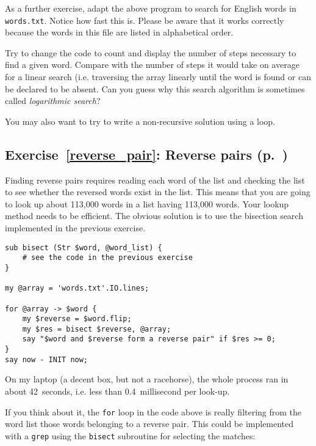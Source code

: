 As a further exercise, adapt the above program to 
search for English words in {\tt words.txt}. Notice 
how fast this is. Please 
be aware that it works correctly because the words 
in this file are listed in alphabetical order.

Try to change 
the code to count and display the number of steps 
necessary to find a given word. Compare with the number 
of steps it would take on average for a linear search 
(i.e. traversing the array linearly until the word 
is found or can be declared to be absent. Can you 
guess why this search algorithm is sometimes 
called \emph{logarithmic search}?

You may also want to try to write a non-recursive solution 
using a loop.


\subsection{Exercise~\ref{reverse_pair}: Reverse pairs (p.~\pageref{reverse_pair})}
\label{sol_reverse_pair}

Finding reverse pairs requires reading each word of 
the list and checking the list to see whether the reversed 
words exist in the list. This means that you are 
going to look up about 113,000 words in a list having 
113,000 words. Your lookup method needs to be efficient.
The obvious solution is to use the bisection search 
implemented in the previous exercise.

\begin{verbatim}
sub bisect (Str $word, @word_list) {
    # see the code in the previous exercise
}

my @array = 'words.txt'.IO.lines;

for @array -> $word {
    my $reverse = $word.flip;
    my $res = bisect $reverse, @array;
    say "$word and $reverse form a reverse pair" if $res >= 0;
}
say now - INIT now;
\end{verbatim}

On my laptop (a decent box, but not a racehorse), 
the whole process ran in about 42~seconds, i.e. 
less than 0.4~millisecond per look-up.

If you think about it, the {\tt for} loop in the code 
above is really filtering from the word list those words 
belonging to a reverse pair. This could be implemented 
with a {\tt grep} using the {\tt bisect} subroutine for 
selecting the matches:

